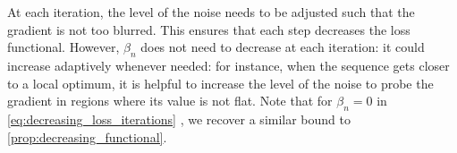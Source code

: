 At each iteration, the level of the noise needs to be adjusted such that the gradient is not too blurred. This ensures that each step decreases the loss functional. However, $\beta_n$ does not need to decrease at each iteration: it could increase adaptively whenever needed: for instance, when  the sequence gets closer to a local optimum, it is helpful to increase the level of the noise to probe the gradient in regions where its value is not flat.
	Note that for $\beta_n = 0$  in \cref{eq:decreasing_loss_iterations} , we recover a similar bound to \cref{prop:decreasing_functional}.
 
 
 
